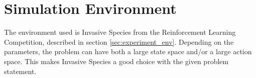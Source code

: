 \section{Simulation Environment}
\label{sec:env_used}
The environment used is Invasive Species from the Reinforcement Learning Competition, described in section \ref{sec:experiment_env}. Depending on the parameters, the problem can have both a large state space and/or a large action space. This makes Invasive Species a good choice with the given problem statement.

